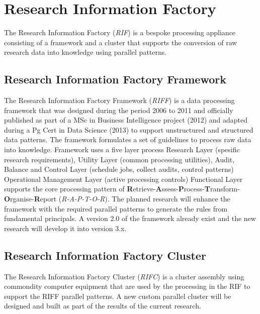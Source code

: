 \documentclass{acm_proc_article-sp}
\begin{document}
\section{Research Information Factory}
The Research Information Factory (\textit{RIF}) is a bespoke processing appliance consisting of a framework and a cluster that supports the conversion of raw research data into knowledge using parallel patterns. 
\subsection{Research Information Factory Framework}
The Research Information Factory Framework (\textit{RIFF}) is a data processing framework that was designed during the period 2006 to 2011 and officially published as part of a MSc in Business Intelligence project (2012) and adapted during a Pg Cert in Data Science (2013) to support unstructured and structured data patterns.  
The framework formulates a set of guidelines to process raw data into knowledge. 
Framework uses a five layer process Research Layer (spesific research requirements), Utility Layer (common processing utilities), Audit, Balance and Control Layer (schedule jobs, collect audits, control patterns)
Operational Management Layer (active processing controls) Functional Layer supports the core processing pattern of \textbf{R}etrieve-\textbf{A}ssess-\textbf{P}rocess-\textbf{T}ransform-\textbf{O}rganise-\textbf{R}eport (\textit{R-A-P-T-O-R}). The planned research will enhance the framework with the required parallel patterns to generate the rules from fundamental principals. A version 2.0 of the framework already exist and the new research will develop it into version 3.x.
\subsection{Research Information Factory Cluster}
The Research Information Factory Cluster (\textit{RIFC}) is a cluster assembly using commondity computer equipment that are used by the processing in the RIF to support the RIFF parallel patterns. A new custom parallel cluster will be designed and built as part of the results of the current research.
\end{document}

